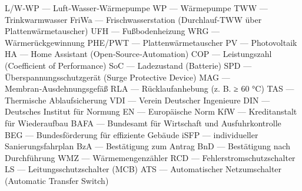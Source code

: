 \markdownRendererDocumentBegin
\markdownRendererUlBeginTight
\markdownRendererUlItem L/W‑WP — Luft‑Wasser‑Wärmepumpe\markdownRendererUlItemEnd 
\markdownRendererUlItem WP — Wärmepumpe\markdownRendererUlItemEnd 
\markdownRendererUlItem TWW — Trinkwarmwasser\markdownRendererUlItemEnd 
\markdownRendererUlItem FriWa — Frischwasserstation (Durchlauf‑TWW über Plattenwärmetauscher)\markdownRendererUlItemEnd 
\markdownRendererUlItem UFH — Fußbodenheizung\markdownRendererUlItemEnd 
\markdownRendererUlItem WRG — Wärmerückgewinnung\markdownRendererUlItemEnd 
\markdownRendererUlItem PHE/PWT — Plattenwärmetauscher\markdownRendererUlItemEnd 
\markdownRendererUlItem PV — Photovoltaik\markdownRendererUlItemEnd 
\markdownRendererUlItem HA — Home Assistant (Open‑Source‑Automation)\markdownRendererUlItemEnd 
\markdownRendererUlItem COP — Leistungszahl (Coefficient of Performance)\markdownRendererUlItemEnd 
\markdownRendererUlItem SoC — Ladezustand (Batterie)\markdownRendererUlItemEnd 
\markdownRendererUlItem SPD — Überspannungsschutzgerät (Surge Protective Device)\markdownRendererUlItemEnd 
\markdownRendererUlItem MAG — Membran‑Ausdehnungsgefäß\markdownRendererUlItemEnd 
\markdownRendererUlItem RLA — Rücklaufanhebung (z. B. ≥ 60 °C)\markdownRendererUlItemEnd 
\markdownRendererUlItem TAS — Thermische Ablaufsicherung\markdownRendererUlItemEnd 
\markdownRendererUlItem VDI — Verein Deutscher Ingenieure\markdownRendererUlItemEnd 
\markdownRendererUlItem DIN — Deutsches Institut für Normung\markdownRendererUlItemEnd 
\markdownRendererUlItem EN — Europäische Norm\markdownRendererUlItemEnd 
\markdownRendererUlItem KfW — Kreditanstalt für Wiederaufbau\markdownRendererUlItemEnd 
\markdownRendererUlItem BAFA — Bundesamt für Wirtschaft und Ausfuhrkontrolle\markdownRendererUlItemEnd 
\markdownRendererUlItem BEG — Bundesförderung für effiziente Gebäude\markdownRendererUlItemEnd 
\markdownRendererUlItem iSFP — individueller Sanierungsfahrplan\markdownRendererUlItemEnd 
\markdownRendererUlItem BzA — Bestätigung zum Antrag\markdownRendererUlItemEnd 
\markdownRendererUlItem BnD — Bestätigung nach Durchführung\markdownRendererUlItemEnd 
\markdownRendererUlItem WMZ — Wärmemengenzähler\markdownRendererUlItemEnd 
\markdownRendererUlItem RCD — Fehlerstromschutzschalter\markdownRendererUlItemEnd 
\markdownRendererUlItem LS — Leitungsschutzschalter (MCB)\markdownRendererUlItemEnd 
\markdownRendererUlItem ATS — Automatischer Netzumschalter (Automatic Transfer Switch)\markdownRendererUlItemEnd 
\markdownRendererUlEndTight \markdownRendererDocumentEnd